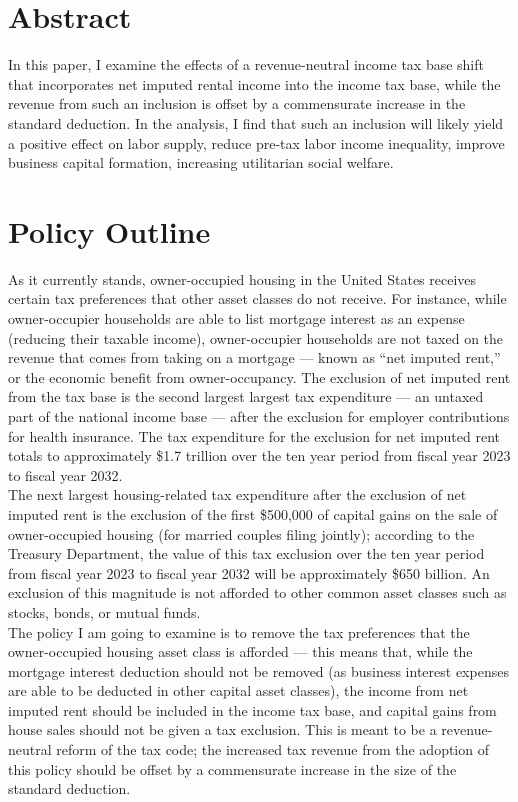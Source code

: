 \documentclass[12pt]{extarticle}
\title{}
\author{}
\date{}
\begin{document}
\doublespacing
  \section*{Abstract}%
  In this paper, I examine the effects of a revenue-neutral income tax base shift that incorporates net imputed rental income into the income tax base, while the revenue from such an inclusion is offset by a commensurate increase in the standard deduction. In the analysis, I find that such an inclusion will likely yield a positive effect on labor supply, reduce pre-tax labor income inequality, improve business capital formation, increasing utilitarian social welfare.
  \section*{Policy Outline}%
  As it currently stands, owner-occupied housing in the United States receives certain tax preferences that other asset classes do not receive. For instance, while owner-occupier households are able to list mortgage interest as an expense (reducing their taxable income), owner-occupier households are not taxed on the revenue that comes from taking on a mortgage --- known as ``net imputed rent,'' or the economic benefit from owner-occupancy.\supercite{yglesias_2016} The exclusion of net imputed rent from the tax base is the second largest largest tax expenditure --- an untaxed part of the national income base --- after the exclusion for employer contributions for health insurance. The tax expenditure for the exclusion for net imputed rent totals to approximately \$1.7 trillion over the ten year period from fiscal year 2023 to fiscal year 2032.\supercite{tax_expenditures}\\

  The next largest housing-related tax expenditure after the exclusion of net imputed rent is the exclusion of the first \$500,000 of capital gains on the sale of owner-occupied housing (for married couples filing jointly); according to the Treasury Department, the value of this tax exclusion over the ten year period from fiscal year 2023 to fiscal year 2032 will be approximately \$650 billion. An exclusion of this magnitude is not afforded to other common asset classes such as stocks, bonds, or mutual funds.\\

  The policy I am going to examine is to remove the tax preferences that the owner-occupied housing asset class is afforded --- this means that, while the mortgage interest deduction should not be removed (as business interest expenses are able to be deducted in other capital asset classes), the income from net imputed rent should be included in the income tax base, and capital gains from house sales should not be given a tax exclusion. This is meant to be a revenue-neutral reform of the tax code; the increased tax revenue from the adoption of this policy should be offset by a commensurate increase in the size of the standard deduction.
\end{document}
